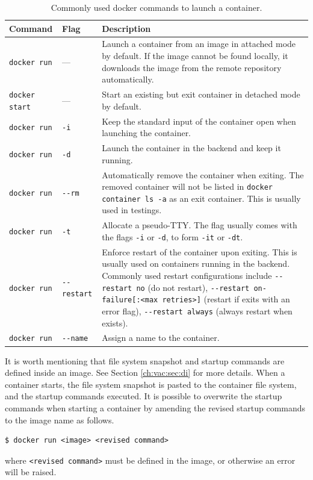 \begin{table}[!htb]
	\centering \caption{Commonly used docker commands to launch a container.}\label{ch:vac:tab:launchcontainer}
	\begin{tabularx}{\textwidth}{llX}
		\hline
		Command & Flag & Description \\ \hline
		\verb|docker run| & --- & Launch a container from an image in attached mode by default. If the image cannot be found locally, it downloads the image from the remote repository automatically. \\
        \verb|docker start| & --- & Start an existing but exit container in detached mode by default. \\
        \verb|docker run| & \verb|-i| & Keep the standard input of the container open when launching the container. \\ 
        \verb|docker run| & \verb|-d| & Launch the container in the backend and keep it running. \\ 
        \verb|docker run| & \verb|--rm| & Automatically remove the container when exiting. The removed container will not be listed in \verb|docker container ls -a| as an exit container. This is usually used in testings. \\ 
        \verb|docker run| & \verb|-t| & Allocate a pseudo-TTY. The flag usually comes with the flags \verb|-i| or \verb|-d|, to form \verb|-it| or \verb|-dt|. \\ 
        \verb|docker run| & \verb|--restart| & Enforce restart of the container upon exiting. This is usually used on containers running in the backend. Commonly used restart configurations include \verb|--restart no| (do not restart), \verb|--restart on-failure[:<max retries>]| (restart if exits with an error flag), \verb|--restart always| (always restart when exists). \\ 
        \verb|docker run| & \verb|--name| & Assign a name to the container. \\
		\hline
	\end{tabularx}
\end{table}

It is worth mentioning that file system snapshot and startup commands are defined inside an image. See Section \ref{ch:vac:sec:di} for more details. When a container starts, the file system snapshot is pasted to the container file system, and the startup commands executed. It is possible to overwrite the startup commands when starting a container by amending the revised startup commands to the image name as follows.
\begin{lstlisting}
$ docker run <image> <revised command>
\end{lstlisting}
where \verb|<revised command>| must be defined in the image, or otherwise an error will be raised.

